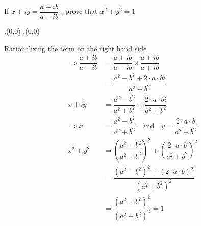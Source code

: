 



\question If $x + \textit{i} y = \dfrac{a+\textit{i} b}{a - \textit{i}b}$ , prove that $x^{2} + y^{2} = 1$ \\ 


\watchout

\ifprintanswers
  \begin{marginfigure}
      :(0,0)
      :(0,0)
    \figdrawbegin{}
      \figdrawline [100,101]
    \figdrawend
    \figvisu{\figBoxA}{}{%
    }
    \centerline{\box\figBoxA}
  \end{marginfigure}
\fi 

\begin{solution}
Rationalizing the term on the right hand side 
\begin{align}
\Rightarrow \dfrac{a+\textit{i} b}{a - \textit{i}b} &= \dfrac{a+\textit{i} b}{a - \textit{i}b} \times \dfrac{a+\textit{i} b}
{a + \textit{i}b} \\
&= \dfrac{a^2 - b^2 + 2\cdot a \cdot b \textit{i}}{a^2 + b^2} \\	
x + \textit{i}y &= \dfrac{a^2 - b^2}{a^2 + b^2} + \dfrac{2\cdot a \cdot b \textit{i}}{a^2 + b^2} \\
\Rightarrow x &= \dfrac{a^2 - b^2}{a^2 + b^2} \quad \text{and} \quad	
y = \dfrac{2\cdot a \cdot b}{a^2 + b^2} \\
x^2 + y^2 &= \left(\dfrac{a^2 - b^2}{a^2 + b^2}\right)^2 +  \left(\dfrac{2\cdot a \cdot b}{a^2 + b^2}\right)^2	\\
&= \dfrac{({a^2 - b^2})^2 + ({2\cdot a \cdot b})^2}{({a^2 + b^2})^2} 	 \\
&= \dfrac{({a^2 + b^2})^2}{({a^2 + b^2})^2} = 1 
\end{align}
\end{solution}


